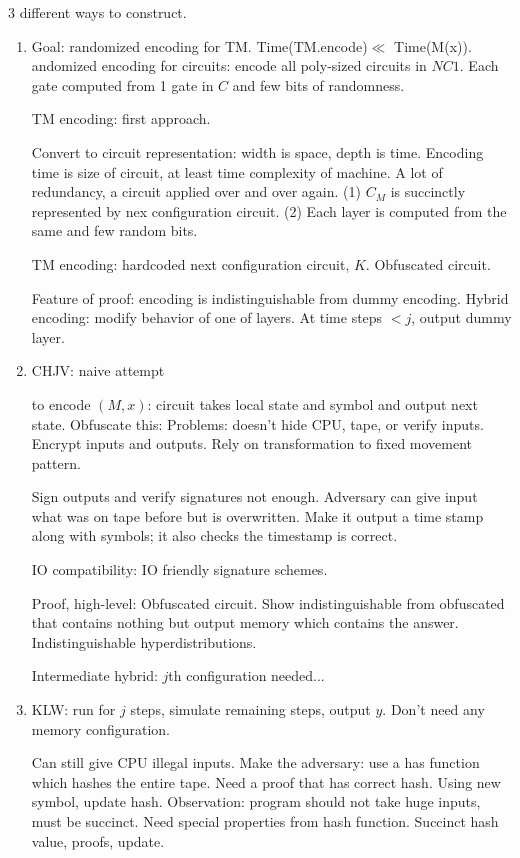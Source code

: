 3 different ways to construct.
\begin{enumerate}
\item
Goal: randomized encoding for TM. Time(TM.encode)$\ll$ Time(M(x)). andomized encoding for circuits: encode all poly-sized circuits in $NC1$. Each gate computed from 1 gate in $C$ and few bits of randomness.

TM encoding: first approach.

Convert to circuit representation: width is space, depth is time. Encoding time is size of circuit, at least time complexity of machine. A lot of redundancy, a circuit applied over and over again. (1) $C_M$ is succinctly represented by nex configuration circuit. (2) Each layer is computed from the same and few random bits.

TM encoding: hardcoded next configuration circuit, $K$. Obfuscated circuit. %

Feature of proof: encoding is indistinguishable from dummy encoding. Hybrid encoding: modify behavior of one of layers. At time steps $<j$, output dummy layer. 
\item
CHJV: naive attempt

to encode $(M,x)$: circuit takes local state and symbol and output next state. Obfuscate this: 
Problems: doesn't hide CPU, tape, or verify inputs.
Encrypt inputs and outputs. 
Rely on transformation to fixed movement pattern.

Sign outputs and verify signatures not enough. Adversary can give input what was on tape before but is overwritten. Make it output a time stamp along with symbols; it also checks the timestamp is correct.

IO compatibility: IO friendly signature schemes.

Proof, high-level: Obfuscated circuit. Show indistinguishable from obfuscated that contains nothing but output memory which contains the answer. Indistinguishable hyperdistributions. 

Intermediate hybrid: $j$th configuration needed...
\item
KLW: run for $j$ steps, simulate remaining steps, output $y$. Don't need any memory configuration. 

Can still give CPU illegal inputs. Make the adversary: use a has function which hashes the entire tape. Need a proof that has correct hash. Using new symbol, update hash. Observation: program should not take huge inputs, must be succinct. Need special properties from hash function.  Succinct hash value, proofs, update.


\end{enumerate}
